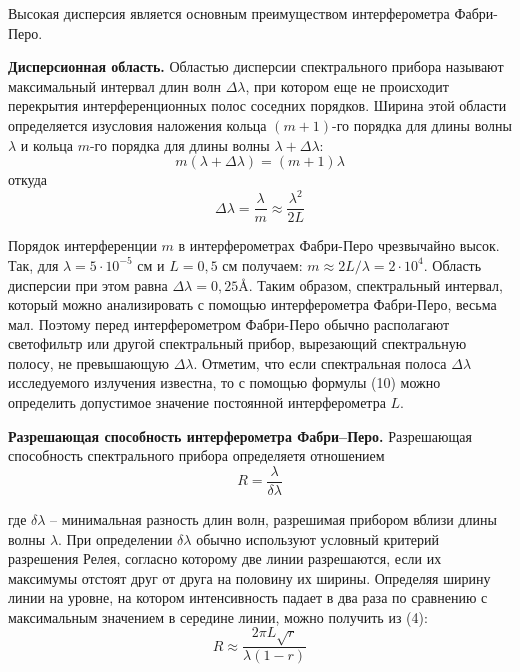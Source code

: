 \documentclass[14pt]{article}
\begin{document}
\noindent Высокая дисперсия является основным преимуществом интерферометра Фабри-Перо.

\vspace{0.5cm}
\textbf{Дисперсионная область.} Областью дисперсии спектрального прибора называют максимальный интервал длин волн
$\Delta\lambda$, при котором еще не происходит перекрытия интерференционных полос соседних порядков.
Ширина этой области определяется изусловия наложения кольца $(m + 1)$-го порядка для длины волны
$\lambda$ и кольца $m$-го порядка для длины волны $\lambda + \Delta\lambda$:
$$
	m(\lambda + \Delta\lambda) = (m + 1)\lambda
$$
\noindent откуда
\begin{equation}
	\Delta\lambda = \frac{\lambda}{m} \approx \frac{\lambda^2}{2L}
\end{equation}

\noindent Порядок интерференции $m$ в интерферометрах Фабри-Перо чрезвычайно высок. Так, для $\lambda = 5\cdot10^{-5}$ см и
$L = 0,5$ см получаем: $m \approx 2L/\lambda = 2\cdot10^4$. Область дисперсии при этом равна $\Delta\lambda = 0,25$\r{A}.
Таким образом, спектральный интервал, который можно анализировать с помощью интерферометра Фабри-Перо, весьма мал.
Поэтому перед интерферометром Фабри-Перо обычно располагают светофильтр или другой спектральный прибор, вырезающий
спектральную полосу, не превышающую $\Delta\lambda$. Отметим, что если спектральная полоса $\Delta\lambda$ исследуемого
излучения известна, то с помощью формулы (10) можно определить допустимое значение постоянной интерферометра $L$.

\vspace{0.5cm}
\textbf{Разрешающая способность интерферометра Фабри–Перо.} Разрешающая способность спектрального прибора определяетя
отношением
\begin{equation}
	R = \frac{\lambda}{\delta\lambda}
\end{equation}

\noindent где $\delta\lambda$ -- минимальная разность длин волн, разрешимая прибором вблизи длины волны $\lambda$.
При определении $\delta\lambda$ обычно используют условный критерий разрешения Релея, согласно которому две линии разрешаются,
если их максимумы отстоят друг от друга на половину их ширины. Определяя ширину линии на уровне, на котором интенсивность падает
в два раза по сравнению с максимальным значением в середине линии, можно получить из (4):
\begin{equation}
	R \approx \frac{2\pi L\sqrt{r}}{\lambda(1 - r)}
\end{equation}
\end{document}
